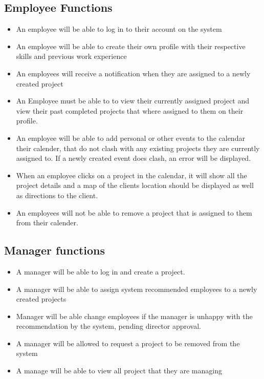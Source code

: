 \documentclass{article}
\begin{document}
	\subsection{Employee Functions}
		\begin{itemize}
			\item An employee will be able to log in to their account on the system
			\item An employee will be able to create their own profile with their        respective skills and previous work experience
			\item An employees will receive a notification when they are assigned to a    newly created project 
			\item An Employee must be able to to view their currently assigned           project and view their past completed projects that where assigned        to them on their profile. 
			\item An employee will be able to add personal or other events to the        calendar their calender, that do not clash with any existing               projects they are currently assigned to. If a newly created event        does clash, an error will be displayed.  
			\item When an employee clicks on a project in the calendar, it will show     all the project details and a map of the clients location should be       displayed as well as directions to the client.
			\item An employees will not be able to remove a project that is assigned     to them from their calender.
		\end{itemize}
      
	\subsection{Manager functions}
		\begin{itemize}
		    \item A manager will be able to log in and create a project.
    		\item A manager will be able to assign system recommended employees to a      newly created projects
    		\item Manager will be able change employees if the manager is unhappy with     the recommendation by the system, pending director approval.
			\item A manager will be allowed to request a project to be removed from       the system
			\item A manage will be able to view all project that they are managing
		\end{itemize}
		
\end{document}
